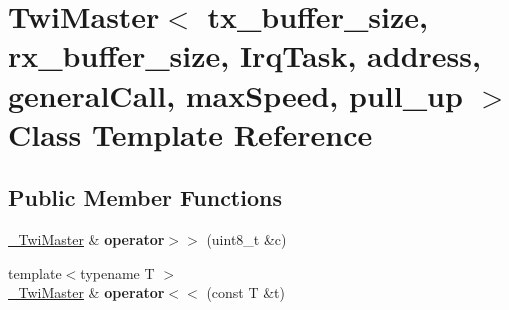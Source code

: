 \hypertarget{classTwiMaster}{}\section{Twi\+Master$<$ tx\+\_\+buffer\+\_\+size, rx\+\_\+buffer\+\_\+size, Irq\+Task, address, general\+Call, max\+Speed, pull\+\_\+up $>$ Class Template Reference}
\label{classTwiMaster}
\subsection*{Public Member Functions}
\begin{DoxyCompactItemize}
\item 
\hyperlink{classTwiMaster}{\+\_\+\+Twi\+Master} \& {\bfseries operator$>$$>$} (uint8\+\_\+t \&c)\hypertarget{classTwiMaster_ad5a5e3d07d15d3a0df00a522e26685f8}{}\label{classTwiMaster_ad5a5e3d07d15d3a0df00a522e26685f8}

\item 
{\footnotesize template$<$typename T $>$ }\\\hyperlink{classTwiMaster}{\+\_\+\+Twi\+Master} \& {\bfseries operator$<$$<$} (const T \&t)\hypertarget{classTwiMaster_a374d865e269be403ffa638c6b1fac64f}{}\label{classTwiMaster_a374d865e269be403ffa638c6b1fac64f}

\end{DoxyCompactItemize}
